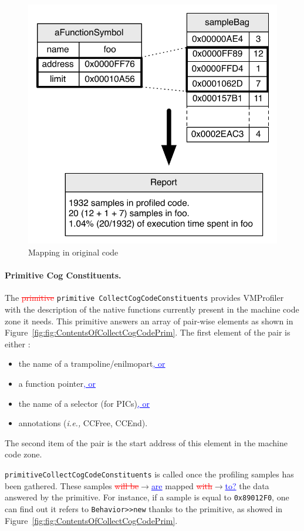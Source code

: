 \documentclass[10pt,preprint,nonatbib]{sigplanconf}
\newcommand{\ct}{\lstinline[backgroundcolor=\color{white},basicstyle=\small\ttfamily]}
\newcommand{\ra}{$\rightarrow$}
\newcommand{\ins}[1]{\textcolor{blue}{\uline{#1}}} %
\newcommand{\del}[1]{\textcolor{red}{\sout{#1}}} %
\newcommand{\chg}[2]{\textcolor{red}{\sout{#1}}{\ra}\textcolor{blue}{\uline{#2}}} %
\newcommand{\ie}{\emph{i.e.,}\xspace}
\newcommand{\figlabel}[1]{\label{fig:#1}}
\newcommand{\figref}[1]{Figure~\ref{fig:#1}}
\begin{document}
 \begin{figure}[t!]
     \begin{center}
         \includegraphics[width=0.85\linewidth]{OriginalMapping}
         \caption{Mapping in original code}
         \figlabel{fig:OriginalMapping}
     \end{center}
 \end{figure}
 
 \paragraph{Primitive Cog Constituents.}
The \del{primitive} \ct{primitive CollectCogCodeConstituents} provides VMProfiler with the description of the native functions currently present in the machine code zone it needs. 
This primitive answers an array of pair-wise elements as shown in \figref{fig:ContentsOfCollectCogCodePrim}. The first element of the pair is either :
\begin{itemize}
	\item the name of a trampoline/enilmopart\ins{, or}
	\item a function pointer\ins{, or}
	\item the name of a selector (for PICs)\ins{, or}
	\item annotations (\ie CCFree, CCEnd).
\end{itemize}
The second item of the pair is the start address of this element in the machine code zone.

\ct{primitiveCollectCogCodeConstituents} is called once the profiling samples has been gathered. These samples \chg{will be}{are} mapped \chg{with}{to?} the data answered by the primitive. For instance, if a sample is equal to \ct{0x89012F0}, one can find out it refers to \ct{Behavior>>new} thanks to the primitive, as showed in \figref{fig:ContentsOfCollectCogCodePrim}.
\end{document}
